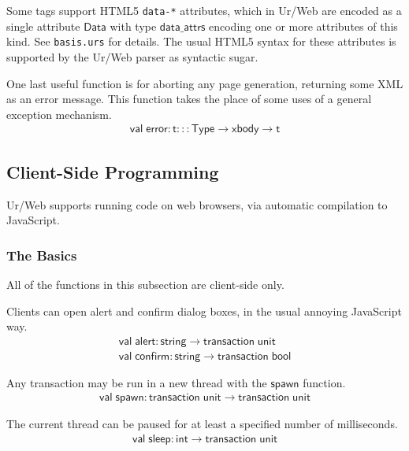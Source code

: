 \documentclass{article}
\newcommand{\mt}[1]{\mathsf{#1}}
\begin{document}
Some tags support HTML5 \texttt{data-*} attributes, which in Ur/Web are encoded as a single attribute $\mt{Data}$ with type $\mt{data\_attrs}$ encoding one or more attributes of this kind.  See \texttt{basis.urs} for details.  The usual HTML5 syntax for these attributes is supported by the Ur/Web parser as syntactic sugar.

One last useful function is for aborting any page generation, returning some XML as an error message.  This function takes the place of some uses of a general exception mechanism.
$$\begin{array}{l}
  \mt{val} \; \mt{error} : \mt{t} ::: \mt{Type} \to \mt{xbody} \to \mt{t}
\end{array}$$


\subsection{Client-Side Programming}

Ur/Web supports running code on web browsers, via automatic compilation to JavaScript.

\subsubsection{The Basics}

All of the functions in this subsection are client-side only.

Clients can open alert and confirm dialog boxes, in the usual annoying JavaScript way.
$$\begin{array}{l}
  \mt{val} \; \mt{alert} : \mt{string} \to \mt{transaction} \; \mt{unit} \\
  \mt{val} \; \mt{confirm} : \mt{string} \to \mt{transaction} \; \mt{bool}
\end{array}$$

Any transaction may be run in a new thread with the $\mt{spawn}$ function.
$$\begin{array}{l}
  \mt{val} \; \mt{spawn} : \mt{transaction} \; \mt{unit} \to \mt{transaction} \; \mt{unit}
\end{array}$$

The current thread can be paused for at least a specified number of milliseconds.
$$\begin{array}{l}
  \mt{val} \; \mt{sleep} : \mt{int} \to \mt{transaction} \; \mt{unit}
\end{array}$$
\end{document}
